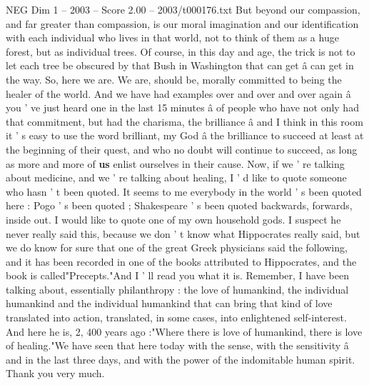 \begin{textsample}{NEG Dim 1 – 2003 – Score 2.00 – 2003/t000176.txt}
But beyond our compassion, and far greater than compassion, is our moral imagination and our identification with each individual who lives in that world, not to think of them as a huge forest, but as individual trees.
Of course, in this day and age, the trick is not to let each tree be obscured by that Bush in Washington that can get â can get in the way.
So, here we are.
We are, should be, morally committed to being the healer of the world.
And we have had examples over and over and over again â you ' ve just heard one in the last 15 minutes â of people who have not only had that commitment, but had the charisma, the brilliance â and I think in this room it ' s easy to use the word brilliant, my God â the brilliance to succeed at least at the beginning of their quest, and who no doubt will continue to succeed, as long as more and more of \textbf{us} enlist ourselves in their cause.
Now, if we ' re talking about medicine, and we ' re talking about healing, I ' d like to quote someone who hasn ' t been quoted.
It seems to me everybody in the world ' s been quoted here : Pogo ' s been quoted ; Shakespeare ' s been quoted backwards, forwards, inside out.
I would like to quote one of my own household gods.
I suspect he never really said this, because we don ' t know what Hippocrates really said, but we do know for sure that one of the great Greek physicians said the following, and it has been recorded in one of the books attributed to Hippocrates, and the book is called"Precepts."And I ' ll read you what it is.
Remember, I have been talking about, essentially philanthropy : the love of humankind, the individual humankind and the individual humankind that can bring that kind of love translated into action, translated, in some cases, into enlightened self-interest.
And here he is, 2, 400 years ago :"Where there is love of humankind, there is love of healing."We have seen that here today with the sense, with the sensitivity â and in the last three days, and with the power of the indomitable human spirit.
Thank you very much.

\end{textsample}
